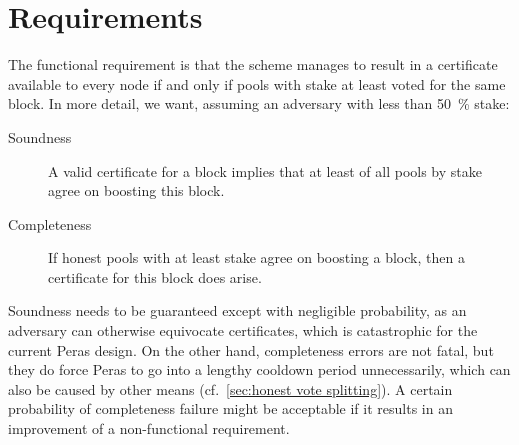 \section{Requirements}

The functional requirement is that the scheme manages to result in a certificate available to every node if and only if pools with stake at least \perasQuorum{} voted for the same block.
In more detail, we want, assuming an adversary with less than \qty{50}{\percent} stake:
\begin{description}
\item[Soundness]
  A valid certificate for a block implies that at least \perasQuorum{} of all pools by stake agree on boosting this block.
\item[Completeness]
  If honest pools with at least \perasQuorum{} stake agree on boosting a block, then a certificate for this block does arise.
\end{description}
Soundness needs to be guaranteed except with negligible probability, as an adversary can otherwise equivocate certificates, which is catastrophic for the current Peras design.
On the other hand, completeness errors are not fatal, but they do force Peras to go into a lengthy cooldown period unnecessarily, which can also be caused by other means (cf.~\cref{sec:honest vote splitting}).
A certain probability of completeness failure might be acceptable if it results in an improvement of a non-functional requirement.

